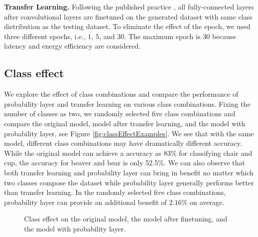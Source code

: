 \documentclass[pageno]{jpaper}
\begin{document}
\textbf{Transfer Learning.} Following the published practice \cite{doersch2015unsupervised, han2016mcdnn, oquab2014learning, shen2016fast, yosinski2014transferable}, all fully-connected layers after convolutional layers are finetuned on the generated dataset with same class distribution as the testing dataset. To eliminate the effect of the epoch, we used three different epochs, i.e., $1$, $5$, and $30$. The maximum epoch is $30$ because latency and energy efficiency are considered.

\subsection{Class effect}
We explore the effect of class combinations and compare the performance of probability layer and transfer learning on various class combinations. Fixing the number of classes as two, we randomly selected five class combinations and compare the original model, model after transfer learning, and the model with probability layer, see Figure \ref{fig:classEffectExamples}. We see that with the same model, different class combinations may have dramatically different accuracy. While the original model can achieve a accuracy as 83\% for classifying chair and cup, the accuracy for beaver and bear is only 52.5\%. We can also observe that both transfer learning and probability layer can bring in benefit no matter which two classes compose the dataset while probability layer generally performs better than transfer learning. In the randomly selected five class combinations, probability layer can provide an additional benefit of $2.16\%$ on average.



   \begin{figure}
     \hfill
     \caption{Class effect on the original model, the model after finetuning, and the model with probability layer.} \label{fig:classEffect1}
   \end{figure}
\end{document}
